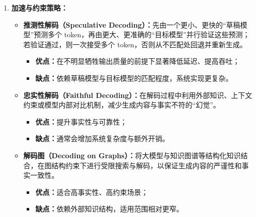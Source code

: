 \documentclass[../main.tex]{subfiles}
\begin{document}
\begin{enumerate}
    \item \textbf{加速与约束策略：}
    \begin{itemize}
        \item \textbf{推测性解码（Speculative Decoding）：}先由一个更小、更快的“草稿模型”预测多个 token，再由更大、更准确的“目标模型”并行验证这些预测；若验证通过，则一次接受多个 token，否则从不匹配处回退并重新生成。
        \begin{itemize}
            \item \textbf{优点：}在不明显牺牲输出质量的前提下显著降低延迟、提高吞吐；
            \item \textbf{缺点：}依赖草稿模型与目标模型的匹配程度，系统实现更复杂。
        \end{itemize}

        \item \textbf{忠实性解码（Faithful Decoding）：}在解码过程中利用外部知识、上下文约束或模型内部对比机制，减少生成内容与事实不符的“幻觉”。
        \begin{itemize}
            \item \textbf{优点：}提升事实性与可靠性；
            \item \textbf{缺点：}通常会增加系统复杂度与额外开销。
        \end{itemize}

        \item \textbf{解码图（Decoding on Graphs）：}将大模型与知识图谱等结构化知识结合，在图结构约束下进行受限搜索与解码，以保证生成内容的严谨性和事实一致性。
        \begin{itemize}
            \item \textbf{优点：}适合高事实性、高约束场景；
            \item \textbf{缺点：}依赖外部知识结构，适用范围相对更窄。
        \end{itemize}
    \end{itemize}
\end{enumerate}
\end{document}
